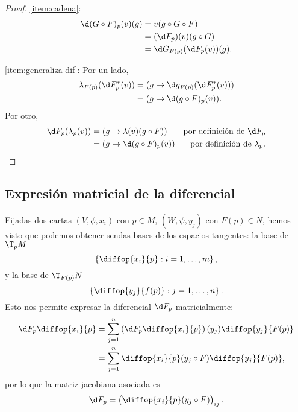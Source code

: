 \begin{proof}
  \ref{item:cadena}:
  \begin{align*}
    \d (G\circ F)_{p}(v)(g) &= v(g\circ G\circ F) \\
                            &= (\d F_{p})(v)(g\circ G) \\
    &= \d G_{F(p)}(\d F_{p}(v))(g).
  \end{align*}

  \ref{item:generaliza-dif}: 
  Por un lado,
  \begin{align*}
    \lambda_{F(p)}(\d F_{p}^{*}(v)) & = (g \mapsto \d g_{F(p)} (\d F_{p}^{*}(v)))
    \\
    & = (g \mapsto \d (g\circ F)_{p}(v)).
  \end{align*}
  Por otro,
  \begin{align*}
    \d F_{p}(\lambda_{p}(v)) & = (g \mapsto \lambda(v)(g\circ F)) & \text{por
                                                                definición de
                                                                $\d F_{p}$} \\
    & = (g \mapsto \d (g\circ F)_{p}(v)) & \text{por definición de $\lambda_{p}$}.
  \end{align*}
\end{proof}

\subsection{Expresión matricial de la diferencial}

Fijadas dos cartas $(V,\phi,x_{i})$ con $p\in M$, $(W,\psi,y_{j})$ con $F(p)\in
N$, hemos visto que podemos obtener sendas bases de los espacios tangentes: la
base de $\T_{p}M$
\[
  \left\{ \diffop{x_{i}}{p} : i=1,\dots,m \right\}
,\]
y la base de $\T_{F(p)}N$
\[
  \left\{ \diffop{y_{j}}{f(p)} : j=1,\dots,n \right\}
.\]
Esto nos permite expresar la diferencial $\d F_{p}$ matricialmente:
\begin{align*}
\d F_{p}\diffop{x_{i}}{p} &= \sum_{j=1}^{n} \left( \d F_{p}\diffop{x_{i}}{p}
                              \right)(y_{j})\diffop{y_{j}}{F(p)} \\
  & = \sum_{j=1}^{n}\diffop{x_{i}}{p}(y_{j}\circ F)\diffop{y_{j}}{F(p)},
\end{align*}
por lo que la matriz jacobiana asociada es
\[
  \d F_{p} =
  \begin{pmatrix}
    \diffop{x_{i}}{p}(y_{j}\circ F)
  \end{pmatrix}_{ij}
.\]

